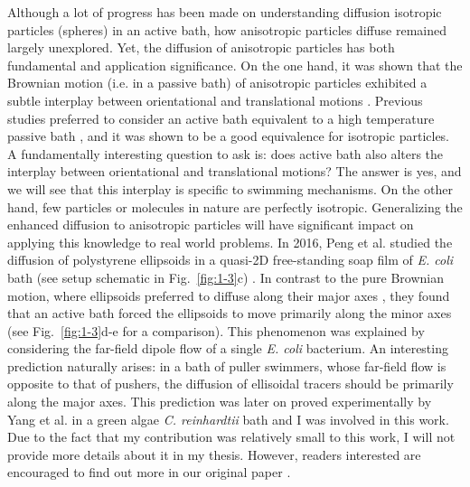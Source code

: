 Although a lot of progress has been made on understanding diffusion isotropic particles (spheres) in an active bath, how anisotropic particles diffuse remained largely unexplored. Yet, the diffusion of anisotropic particles has both fundamental and application significance. On the one hand, it was shown that the Brownian motion (i.e. in a passive bath) of anisotropic particles exhibited a subtle interplay between orientational and translational motions \cite{Han2006}. Previous studies preferred to consider an active bath equivalent to a high temperature passive bath \cite{Wu2000}, and it was shown to be a good equivalence for isotropic particles. A fundamentally interesting question to ask is: does active bath also alters the interplay between orientational and translational motions? The answer is yes, and we will see that this interplay is specific to swimming mechanisms. On the other hand, few particles or molecules in nature are perfectly isotropic. Generalizing the enhanced diffusion to anisotropic particles will have significant impact on applying this knowledge to real world problems. In 2016, Peng et al. studied the diffusion of polystyrene ellipsoids in a quasi-2D free-standing soap film of \textit{E. coli} bath (see setup schematic in Fig.~\ref{fig:1-3}c) \cite{Peng2016}. In contrast to the pure Brownian motion, where ellipsoids preferred to diffuse along their major axes \cite{Han2006}, they found that an active bath forced
the ellipsoids to move primarily along the minor axes (see Fig.~\ref{fig:1-3}d-e for a comparison). This phenomenon was explained by considering the far-field dipole flow of a single \textit{E. coli} bacterium. An interesting prediction naturally arises: in a bath of puller swimmers, whose far-field flow is opposite to that of pushers, the diffusion of ellisoidal tracers should be primarily along the major axes. This prediction was later on proved experimentally by Yang et al. \cite{Yang2016} in a green algae \textit{C. reinhardtii} bath and I was involved in this work. Due to the fact that my contribution was relatively small to this work, I will not provide more details about it in my thesis. However, readers interested are encouraged to find out more in our original paper \cite{Yang2016}.


